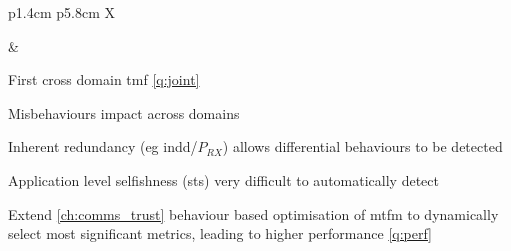 \begin{table}
{\begin{tabularx}{\textwidth}{p{1.4cm} p{5.8cm} X}
\begin{minipage}[t]{\linewidth}
			\end{minipage}
			& \begin{minipage}[t]{\linewidth}
				\begin{tightimize} 
					\item First cross domain \gls{tmf} \autoref{q:joint}
					\item Misbehaviours impact across domains %
					\item Inherent redundancy (eg \gls{indd}/$P_{RX}$) allows differential behaviours to be detected %
					\item Application level selfishness (\gls{sts}) very difficult to automatically detect
					\item Extend \autoref{ch:comms_trust} behaviour based optimisation of \gls{mtfm} to dynamically select most significant metrics, leading to higher performance \autoref{q:perf}
				\end{tightimize}
			\end{minipage}\\
			\bottomrule
		\end{tabularx}
	}
\end{table}





